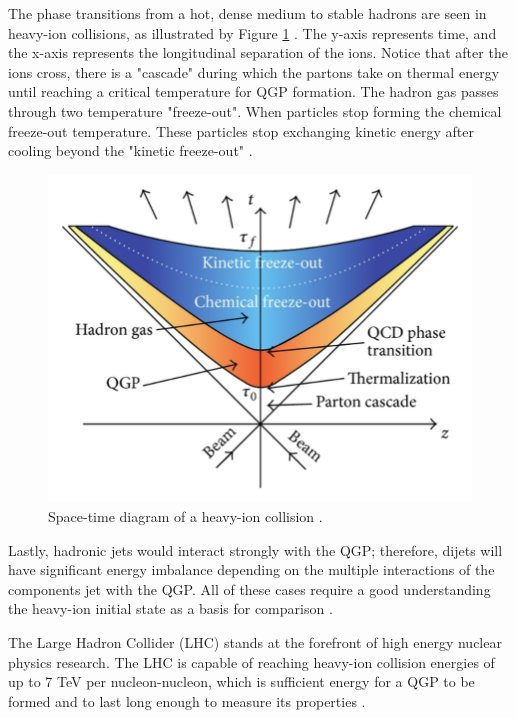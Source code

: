 The phase transitions from a hot, dense medium to stable hadrons are seen in heavy-ion collisions, as illustrated by Figure \ref{fig:historyHI} \cite{Wang:2012jua}. The y-axis represents time, and the x-axis represents the longitudinal separation of the ions. Notice that after the ions cross, there is a "cascade" during which the partons take on thermal energy until reaching a critical temperature for QGP formation. The hadron gas passes through two temperature "freeze-out". When particles stop forming the chemical freeze-out temperature. These particles stop exchanging kinetic energy after cooling beyond the "kinetic freeze-out" \cite{bjEdense}.

\begin{figure}[h!]
\begin{centering}
\includegraphics[width=5in]{Chapter1/importfigs/The-space-time-evolution-of-heavy-ion-collision-The-figure-is-taken-from-28.png}
\par\end{centering}
\caption{Space-time diagram of a heavy-ion collision \cite{Wang:2012jua}.\label{fig:historyHI}}
\end{figure}

Lastly, hadronic jets would interact strongly with the QGP; therefore, dijets will have significant energy imbalance depending on the multiple interactions of the components jet with the QGP. All of these cases require a good understanding the heavy-ion initial state as a basis for comparison \cite{Vogt:1998kna}. 

The Large Hadron Collider (LHC) stands at the forefront of high energy nuclear physics research. The LHC is capable of reaching heavy-ion collision energies of up to 7 TeV per nucleon-nucleon, which is sufficient energy for a QGP to be formed and to last long enough to measure its properties \cite{Roland:2014jsa,Frankfurt:2005mc,Vogt:2002ve}.